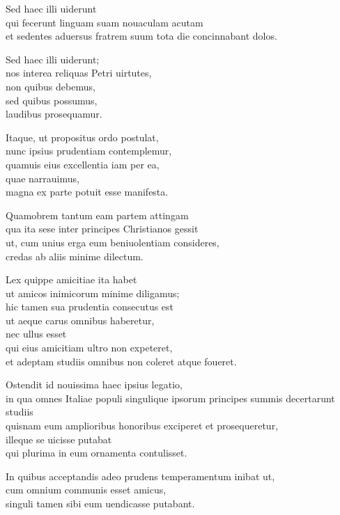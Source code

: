 \documentclass[a5paper,twoside]{article}
\begin{document}
Sed haec illi uiderunt \\
qui fecerunt linguam suam nouaculam acutam \\
et sedentes aduersus fratrem suum tota die concinnabant dolos. 

Sed haec illi uiderunt; \\
nos interea reliquas Petri uirtutes, \\
non quibus debemus, \\
sed quibus possumus, \\
laudibus prosequamur.

Itaque, ut propositus ordo postulat, \\
nunc ipsius prudentiam contemplemur, \\
quamuis eius excellentia iam per ea, \\
quae narrauimus, \\
magna ex parte potuit esse manifesta. 

Quamobrem tantum eam partem attingam \\
qua ita sese inter principes Christianos gessit \\
ut, cum unius erga eum beniuolentiam consideres, \\
credas ab aliis minime dilectum. 

Lex quippe amicitiae ita habet \\
ut amicos inimicorum minime diligamus; \\
hic tamen sua prudentia consecutus est \\
ut aeque carus omnibus haberetur, \\
nec ullus esset \\
qui eius amicitiam ultro non expeteret, \\
et adeptam studiis omnibus non coleret atque foueret.

Ostendit id nouissima haec ipsius legatio, \\
in qua omnes Italiae populi singulique ipsorum principes summis decertarunt studiis \\
quisnam eum amplioribus honoribus exciperet et prosequeretur, \\
illeque se uicisse putabat \\
qui plurima in eum ornamenta contulisset.
 
In quibus acceptandis adeo prudens temperamentum inibat ut, \\
cum omnium communis esset amicus, \\
singuli tamen sibi eum uendicasse putabant. 
\end{document}
